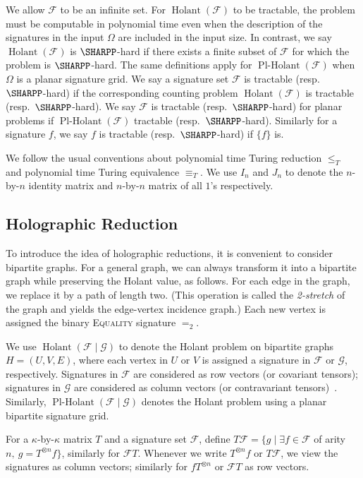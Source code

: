\documentclass[11pt]{article}
\newcommand{\Holant}{\operatorname{Holant}}
\newcommand{\PlHolant}{\operatorname{Pl-Holant}}
\newcommand{\holant}[2]{\Holant(#1\mid #2)}
\newcommand{\plholant}[2]{\PlHolant(#1\mid #2)}
\begin{document}
We allow $\mathcal{F}$ to be an infinite set.
For $\Holant(\mathcal{F})$ to be tractable,
the problem must be computable in polynomial time even when the description of the signatures in the input $\Omega$ are included in the input size.
In contrast,
we say $\Holant(\mathcal{F})$ is $\SHARPP$-hard if there exists a finite subset of $\mathcal{F}$ for which the problem is $\SHARPP$-hard.
The same definitions apply for $\PlHolant(\mathcal{F})$ when $\Omega$ is a planar signature grid.
We say a signature set $\mathcal{F}$ is tractable (resp.~$\SHARPP$-hard)
if the corresponding counting problem $\Holant(\mathcal{F})$ is tractable (resp.~$\SHARPP$-hard).
We say $\mathcal{F}$ is tractable (resp.~$\SHARPP$-hard) for planar problems
if $\PlHolant(\mathcal{F})$ tractable (resp.~$\SHARPP$-hard).
Similarly for a signature $f$,
we say $f$ is tractable (resp.~$\SHARPP$-hard) if $\{f\}$ is.

We follow the usual conventions about polynomial time Turing reduction $\le_T$ and polynomial time Turing equivalence $\equiv_T$.
We use $I_n$ and $J_n$ to denote the $n$-by-$n$ identity matrix and $n$-by-$n$ matrix of all $1$'s respectively.

\subsection{Holographic Reduction}

To introduce the idea of holographic reductions, it is convenient to consider bipartite graphs.
For a general graph, we can always transform it into a bipartite graph while preserving the Holant value, as follows.
For each edge in the graph, we replace it by a path of length two.
(This operation is called the \emph{2-stretch} of the graph and yields the edge-vertex incidence graph.)
Each new vertex is assigned the binary \textsc{Equality} signature $=_2$.

We use $\holant{\mathcal{F}}{\mathcal{G}}$ to denote the Holant problem on bipartite graphs $H = (U,V,E)$,
where each vertex in $U$ or $V$ is assigned a signature in $\mathcal{F}$ or $\mathcal{G}$, respectively.
Signatures in $\mathcal{F}$ are considered as row vectors (or covariant tensors);
signatures in $\mathcal{G}$ are considered as column vectors (or contravariant tensors)~\cite{DP91}.
Similarly, $\plholant{\mathcal{F}}{\mathcal{G}}$ denotes the Holant problem using a planar bipartite signature grid.

For a $\kappa$-by-$\kappa$ matrix $T$ and a signature set $\mathcal{F}$,
define $T \mathcal{F} = \{g \mid \exists f \in \mathcal{F}$ of arity $n,~g = T^{\otimes n} f\}$, similarly for $\mathcal{F} T$.
Whenever we write $T^{\otimes n} f$ or $T \mathcal{F}$,
we view the signatures as column vectors;
similarly for $f T^{\otimes n} $ or $\mathcal{F} T$ as row vectors.
\end{document}
